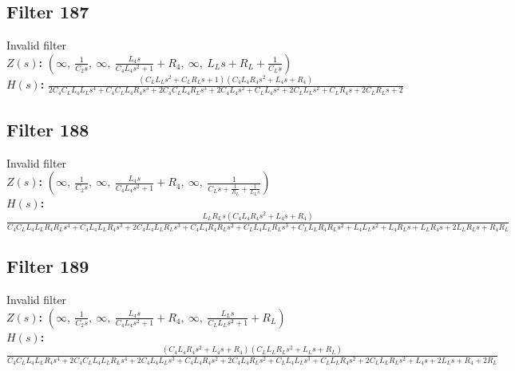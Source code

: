 \documentclass{article}
\begin{document}
\subsection*{Filter 187}
Invalid filter \\ 
\textbf{$Z(s)$:} $\left( \infty, \  \frac{1}{C_{2} s}, \  \infty, \  \frac{L_{4} s}{C_{4} L_{4} s^{2} + 1} + R_{4}, \  \infty, \  L_{L} s + R_{L} + \frac{1}{C_{L} s}\right)$ \\ 
\textbf{$H(s)$:} $\frac{\left(C_{L} L_{L} s^{2} + C_{L} R_{L} s + 1\right) \left(C_{4} L_{4} R_{4} s^{2} + L_{4} s + R_{4}\right)}{2 C_{4} C_{L} L_{4} L_{L} s^{4} + C_{4} C_{L} L_{4} R_{4} s^{3} + 2 C_{4} C_{L} L_{4} R_{L} s^{3} + 2 C_{4} L_{4} s^{2} + C_{L} L_{4} s^{2} + 2 C_{L} L_{L} s^{2} + C_{L} R_{4} s + 2 C_{L} R_{L} s + 2}$ \\ 
\subsection*{Filter 188}
Invalid filter \\ 
\textbf{$Z(s)$:} $\left( \infty, \  \frac{1}{C_{2} s}, \  \infty, \  \frac{L_{4} s}{C_{4} L_{4} s^{2} + 1} + R_{4}, \  \infty, \  \frac{1}{C_{L} s + \frac{1}{R_{L}} + \frac{1}{L_{L} s}}\right)$ \\ 
\textbf{$H(s)$:} $\frac{L_{L} R_{L} s \left(C_{4} L_{4} R_{4} s^{2} + L_{4} s + R_{4}\right)}{C_{4} C_{L} L_{4} L_{L} R_{4} R_{L} s^{4} + C_{4} L_{4} L_{L} R_{4} s^{3} + 2 C_{4} L_{4} L_{L} R_{L} s^{3} + C_{4} L_{4} R_{4} R_{L} s^{2} + C_{L} L_{4} L_{L} R_{L} s^{3} + C_{L} L_{L} R_{4} R_{L} s^{2} + L_{4} L_{L} s^{2} + L_{4} R_{L} s + L_{L} R_{4} s + 2 L_{L} R_{L} s + R_{4} R_{L}}$ \\ 
\subsection*{Filter 189}
Invalid filter \\ 
\textbf{$Z(s)$:} $\left( \infty, \  \frac{1}{C_{2} s}, \  \infty, \  \frac{L_{4} s}{C_{4} L_{4} s^{2} + 1} + R_{4}, \  \infty, \  \frac{L_{L} s}{C_{L} L_{L} s^{2} + 1} + R_{L}\right)$ \\ 
\textbf{$H(s)$:} $\frac{\left(C_{4} L_{4} R_{4} s^{2} + L_{4} s + R_{4}\right) \left(C_{L} L_{L} R_{L} s^{2} + L_{L} s + R_{L}\right)}{C_{4} C_{L} L_{4} L_{L} R_{4} s^{4} + 2 C_{4} C_{L} L_{4} L_{L} R_{L} s^{4} + 2 C_{4} L_{4} L_{L} s^{3} + C_{4} L_{4} R_{4} s^{2} + 2 C_{4} L_{4} R_{L} s^{2} + C_{L} L_{4} L_{L} s^{3} + C_{L} L_{L} R_{4} s^{2} + 2 C_{L} L_{L} R_{L} s^{2} + L_{4} s + 2 L_{L} s + R_{4} + 2 R_{L}}$ \\ 
\end{document}
